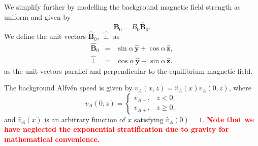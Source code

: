 \documentclass[linenumbers]{aastex63}
\let\vec\boldsymbol
\newcommand{\alexedit}[1]{\textcolor{red}{\textbf{#1}}}
\begin{document}
We simplify further by modelling the background magnetic field strength as uniform and given by
\begin{equation}
    \vec{B}_0 = B_0 \vec{\hat{B}}_0.
\end{equation}
We define the unit vectors $\vec{\hat{B}}_0$, $\vec{\hat{\perp}}$ as
\begin{eqnarray}
    \vec{\hat{B}}_0 & = & \sin\alpha\, \vec{\hat{y}} + \cos\alpha\, \vec{\hat{z}}, \\
    \vec{\hat{\perp}} & = & \cos\alpha\, \vec{\hat{y}} - \sin\alpha\, \vec{\hat{z}}.
\end{eqnarray}
as the unit vectors parallel and perpendicular to the equilibrium magnetic field.

The background Alfv\'en speed is given by $v_A(x,z) = \hat{v}_A(x)v_A(0,z)$, where
\begin{equation}
    \label{eq:alfven_speed_along_z}
    v_A(0,z) = \begin{cases}
    v_{A-}, & z < 0, \\
    v_{A+}, & z \ge 0,
    \end{cases}
\end{equation}
and $\hat{v}_A(x)$ is an arbitrary function of $x$ satisfying $\hat{v}_A(0)=1$. \alexedit{Note that we have neglected the exponential stratification due to gravity for mathematical convenience.}
\end{document}
